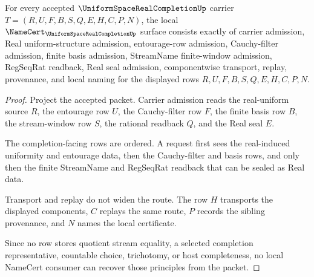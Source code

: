 \begin{theorem}
\label{thm:uniform-space-real-completion-namecert-obligations}
For every accepted $\UniformSpaceRealCompletionUp$ carrier $T=(R,U,F,B,S,Q,E,H,C,P,N)$, the local $\NameCert_{\UniformSpaceRealCompletionUp}$ surface consists exactly of carrier admission, Real uniform-structure admission, entourage-row admission, Cauchy-filter admission, finite basis admission, StreamName finite-window admission, RegSeqRat readback, Real seal admission, componentwise transport, replay, provenance, and local naming for the displayed rows $R,U,F,B,S,Q,E,H,C,P,N$.
\end{theorem}
\begin{proof}
Project the accepted packet. Carrier admission reads the real-uniform source $R$, the entourage row $U$, the Cauchy-filter row $F$, the finite basis row $B$, the stream-window row $S$, the rational readback $Q$, and the Real seal $E$.

The completion-facing rows are ordered. A request first sees the real-induced uniformity and entourage data, then the Cauchy-filter and basis rows, and only then the finite StreamName and RegSeqRat readback that can be sealed as Real data.

Transport and replay do not widen the route. The row $H$ transports the displayed components, $C$ replays the same route, $P$ records the sibling provenance, and $N$ names the local certificate.

Since no row stores quotient stream equality, a selected completion representative, countable choice, trichotomy, or host completeness, no local NameCert consumer can recover those principles from the packet.
\end{proof}

